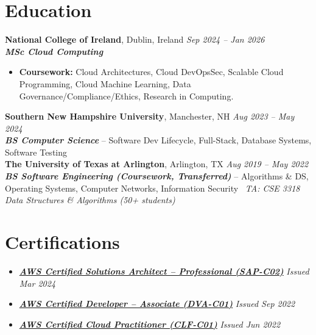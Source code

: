 \documentclass[10pt,a4paper]{article}
\begin{document}
\section*{Education}
\textbf{National College of Ireland}, Dublin, Ireland \hfill \textit{Sep 2024 -- Jan 2026}\\[-0.15em]
\textbf{\textit{MSc Cloud Computing}}\\[-0.25em]
\begin{itemize}
  \item \textbf{Coursework:} Cloud Architectures, Cloud DevOpsSec, Scalable Cloud Programming, Cloud Machine Learning, Data Governance/Compliance/Ethics, Research in Computing.
\end{itemize} 

\vspace{0.12em}
\textbf{Southern New Hampshire University}, Manchester, NH \hfill \textit{Aug 2023 -- May 2024}\\[-0.15em]
\textbf{\textit{BS Computer Science}} -- Software Dev Lifecycle, Full-Stack, Database Systems, Software Testing\\[0.05em]

\textbf{The University of Texas at Arlington}, Arlington, TX \hfill \textit{Aug 2019 -- May 2022}\\[-0.15em]
\textbf{\textit{BS Software Engineering (Coursework, Transferred)}} -- Algorithms \& DS, Operating Systems, Computer Networks, Information Security \textbar\ \textit{TA: CSE 3318 Data Structures \& Algorithms (50+ students)}

\section*{Certifications}
\begin{itemize}
  \item \href{https://www.credly.com/badges/6e22a6c0-9922-49d5-b59f-34cc593c82c3/public_url}{\textbf{\textit{AWS Certified Solutions Architect -- Professional (SAP-C02)}}} \hfill \textit{Issued Mar 2024}
  \item \href{https://www.credly.com/badges/84671bf4-ce9f-4d8b-a0de-0ef606ad5646/public_url}{\textbf{\textit{AWS Certified Developer -- Associate (DVA-C01)}}} \hfill \textit{Issued Sep 2022}
  \item \href{https://www.credly.com/badges/e671b9de-e72a-48cb-82fc-33776c285174/public_url}{\textbf{\textit{AWS Certified Cloud Practitioner (CLF-C01)}}} \hfill \textit{Issued Jun 2022}
\end{itemize}
\end{document}
